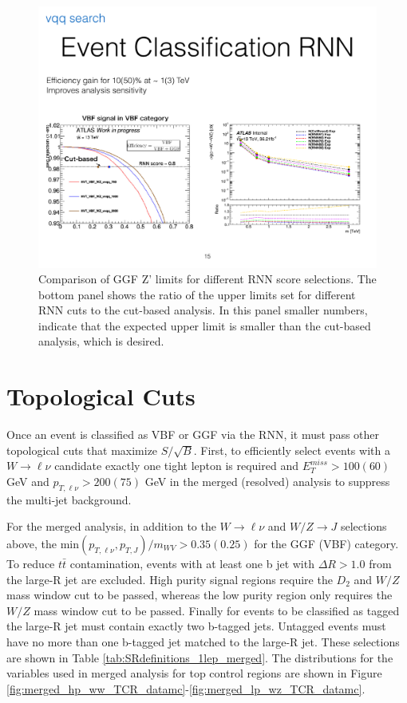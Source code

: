 \begin{figure}[h!]
  \centering
  \includegraphics[width=\hsize]{figures/Analysis/rnn_limits.pdf}
  \caption{Comparison of GGF Z' limits for different RNN score selections. The bottom panel shows the ratio of the upper limits set for different RNN cuts to the cut-based analysis. In this panel smaller numbers, indicate that the expected upper limit is smaller than the cut-based analysis, which is desired.} 
  \label{fig:rnn_limits}
\end{figure}
\FloatBarrier

\section{Topological Cuts}
\label{Topological Cuts}
Once an event is classified as VBF or GGF via the RNN, it must pass other topological cuts that maximize $S/\sqrt{B}$. First, to efficiently select events with a $W\rightarrow \ell \nu$ candidate exactly one tight lepton is required and $E_{T}^{miss} > 100(60)$ GeV and $p_{T,\ell\nu} > 200(75)$ GeV in the merged (resolved) analysis to suppress the multi-jet background. 

For the merged analysis, in addition to the $W \rightarrow \ell \nu$ and $W/Z \rightarrow J$ selections above, the min$(p_{T, \ell \nu}, p_{T,J})/m_{WV} > 0.35(0.25)$ for the GGF (VBF) category. To reduce $t\bar{t}$ contamination, events with at least one b jet with $\Delta R > 1.0$ from the large-R jet are excluded. High purity signal regions require the $D_{2}$ and $W/Z$ mass window cut to be passed, whereas the low purity region only requires the  $W/Z$ mass window cut to be passed. Finally for events to be classified as tagged the large-R jet must contain exactly two b-tagged jets. Untagged events must have no more than one b-tagged jet matched to the large-R jet. These selections are shown in Table \ref{tab:SRdefinitions_1lep_merged}. The distributions for the variables used in merged analysis for top control regions are shown in Figure \ref{fig:merged_hp_ww_TCR_datamc}-\ref{fig:merged_lp_wz_TCR_datamc}.

